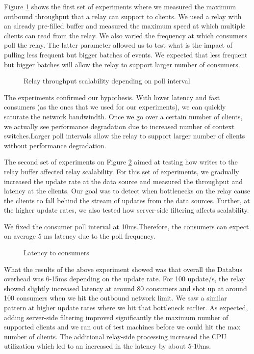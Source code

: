 Figure \ref{fig:relay_throughput} shows the first set of experiments where we measured the maximum outbound throughput that a relay can support to clients. We used a relay with an already pre-filled buffer and measured the maximum speed at which multiple clients can read from the relay. We also varied the frequency at which consumers poll the relay. The latter parameter allowed us to test what is the impact of pulling less frequent but bigger batches of events. We expected that less frequent but bigger batches will allow the relay to support larger number of consumers.

\begin{figure}
\centering
{}
\caption{Relay throughput scalability depending on poll interval}
\label{fig:relay_throughput}
\end{figure}

The experiments confirmed our hypothesis. With lower latency and fast consumers (as the ones that we used for our experiments), we can quickly saturate the network bandwindth. Once we go over a certain number of clients, we actually see performance degradation due to increased number of context switches.Larger poll intervals allow the relay to support larger number of clients without performance degradation.

The second set of experiments on Figure \ref{fig:latency-poll10} aimed at testing how writes to the relay buffer affected relay scalability. For this set of experiments, we gradually increased the update rate at the data source and measured the throughput and latency at the clients. Our goal was to detect when bottlenecks on the relay cause the clients to fall behind the stream of updates from the data sources. Further, at the higher update rates, we also tested how server-side filtering affects scalability.

We fixed the consumer poll interval at 10ms.Therefore, the consumers can expect on average 5 ms latency due to the poll frequency.   

\begin{figure}
\centering
{}
\caption{Latency to consumers}
\label{fig:latency-poll10}
\end{figure}

What the results of the above experiment showed was that overall the Databus overhead was 6-15ms depending on the update rate. For 100 update/s, the relay showed slightly increased latency at around 80 consumers and shot up at around 100 consumers when we hit the outbound network limit. We saw a similar pattern at higher update rates where we hit that bottleneck earlier. As expected, adding server-side filtering improved significantly the maximum number of supported clients and we ran out of test machines before we could hit the max number of clients. The additional relay-side processing increased the CPU utilization which led to an increased in the latency by about 5-10ms.

